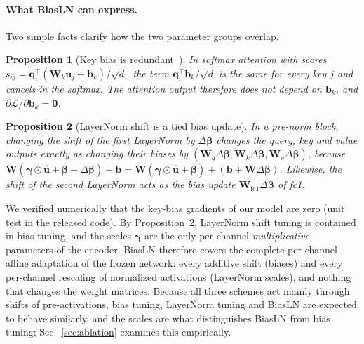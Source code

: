 \documentclass[fonts]{icst}
\newif\ifrevmark\revmarktrue
\newenvironment{revblock}{\ifrevmark\color{revblue}\fi}{}
\newtheorem{proposition}{Proposition}
\begin{document}
\begin{revblock}
\paragraph{What BiasLN can express.}
\label{sec:analysis}
Two simple facts clarify how the two parameter groups overlap.

\begin{proposition}[Key bias is redundant~\cite{namazifar2023bias}]
\label{prop:key}
In softmax attention with scores $s_{ij}=\mathbf{q}_i^\top(\mathbf{W}_k\mathbf{u}_j+\mathbf{b}_k)/\sqrt{d}$, the term $\mathbf{q}_i^\top\mathbf{b}_k/\sqrt{d}$ is the same for every key $j$ and cancels in the softmax. The attention output therefore does not depend on $\mathbf{b}_k$, and $\partial\mathcal{L}/\partial\mathbf{b}_k=\mathbf{0}$.
\end{proposition}

\begin{proposition}[LayerNorm shift is a tied bias update]
\label{prop:fold}
In a pre-norm block, changing the shift of the first LayerNorm by $\Delta\boldsymbol{\beta}$ changes the query, key and value outputs exactly as changing their biases by $(\mathbf{W}_q\Delta\boldsymbol{\beta},\mathbf{W}_k\Delta\boldsymbol{\beta},\mathbf{W}_v\Delta\boldsymbol{\beta})$, because $\mathbf{W}(\boldsymbol{\gamma}\odot\hat{\mathbf{u}}+\boldsymbol{\beta}+\Delta\boldsymbol{\beta})+\mathbf{b}=\mathbf{W}(\boldsymbol{\gamma}\odot\hat{\mathbf{u}}+\boldsymbol{\beta})+(\mathbf{b}+\mathbf{W}\Delta\boldsymbol{\beta})$. Likewise, the shift of the second LayerNorm acts as the bias update $\mathbf{W}_{\mathrm{fc1}}\Delta\boldsymbol{\beta}$ of fc1.
\end{proposition}

We verified numerically that the key-bias gradients of our model are zero (unit test in the released code). By Proposition~\ref{prop:fold}, LayerNorm shift tuning is contained in bias tuning, and the scales $\boldsymbol{\gamma}$ are the only per-channel \emph{multiplicative} parameters of the encoder. BiasLN therefore covers the complete per-channel affine adaptation of the frozen network: every additive shift (biases) and every per-channel rescaling of normalized activations (LayerNorm scales), and nothing that changes the weight matrices. Because all three schemes act mainly through shifts of pre-activations, bias tuning, LayerNorm tuning and BiasLN are expected to behave similarly, and the scales are what distinguishes BiasLN from bias tuning; Sec.~\ref{sec:ablation} examines this empirically.
\end{revblock}
\end{document}
